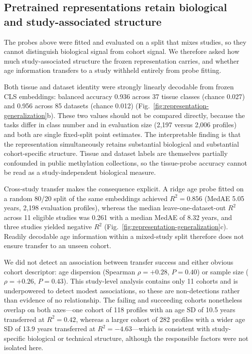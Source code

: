 \subsection{Pretrained representations retain biological and study-associated structure}

The probes above were fitted and evaluated on a split that mixes studies, so they cannot
distinguish biological signal from cohort signal. We therefore asked how much study-associated
structure the frozen representation carries, and whether age information transfers to a study
withheld entirely from probe fitting.

Both tissue and dataset identity were strongly linearly decodable from frozen CLS embeddings:
balanced accuracy 0.936 across 37 tissue classes (chance 0.027) and 0.956 across 85 datasets
(chance 0.012) (Fig.~\ref{fig:representation-generalization}b). These two values should not be
compared directly, because the tasks differ in class number and in evaluation size (2,197
versus 2,006 profiles) and both are single fixed-split point estimates. The interpretable
finding is that the representation simultaneously retains substantial biological and substantial
cohort-specific structure. Tissue and dataset labels are themselves partially confounded in
public methylation collections, so the tissue-probe accuracy cannot be read as a
study-independent biological measure.

Cross-study transfer makes the consequence explicit. A ridge age probe fitted on a random 80/20
split of the same embeddings achieved $R^2=0.856$ (MedAE 5.05 years, 2,198 evaluation
profiles), whereas the median leave-one-dataset-out $R^2$ across 11 eligible studies was 0.261
with a median MedAE of 8.32 years, and three studies yielded negative $R^2$
(Fig.~\ref{fig:representation-generalization}c). Readily decodable age information within a
mixed-study split therefore does not ensure transfer to an unseen cohort.

We did not detect an association between transfer success and either obvious cohort descriptor:
age dispersion (Spearman $\rho=+0.28$, $P=0.40$) or sample size ($\rho=+0.26$, $P=0.43$). This
study-level analysis contains only 11 cohorts and is underpowered to detect modest
associations, so these are non-detections rather than evidence of no relationship. The failing
and succeeding cohorts nonetheless overlap on both axes---one cohort of 118 profiles with an
age SD of 10.5 years transferred at $R^2=0.42$, whereas a larger cohort of 282 profiles with a
wider age SD of 13.9 years transferred at $R^2=-4.63$---which is consistent with
study-specific biological or technical structure, although the responsible factors were not
isolated here.

